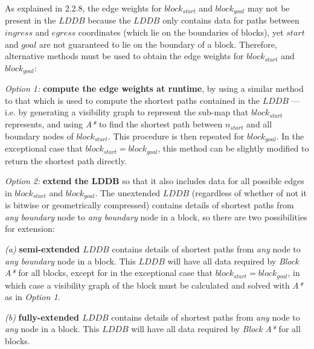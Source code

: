 \documentclass[12pt,notitlepage]{report}
\begin{document}
\noindent
As explained in 2.2.8, the edge weights for $block_{start}$ and $block_{goal}$ may not be present in the $LDDB$ because the $LDDB$ only contains data for paths between $ingress$ and $egress$ coordinates (which lie on the boundaries of blocks), yet $start$ and $goal$ are not guaranteed to lie on the boundary of a block. Therefore, alternative methods must be used to obtain the edge weights for $block_{start}$ and $block_{goal}$:
\begin{description}
\item {\em Option 1:} {\bfseries compute the edge weights at runtime}, by using a similar method to that which is used to compute the shortest paths contained in the $LDDB$ --- i.e. by generating a visibility graph to represent the sub-map that $block_{start}$ represents, and using {\em A*} to find the shortest path between $n_{start}$ and all boundary nodes of $block_{start}$. This procedure is then repeated for $block_{goal}$. In the exceptional case that $block_{start} = block_{goal}$, this method can be slightly modified to return the shortest path directly. 
\item {\em Option 2:} {\bfseries extend the LDDB} so that it also includes data for all possible edges in $block_{start}$ and $block_{goal}$. The unextended $LDDB$ (regardless of whether of not it is bitwise or geometrically compressed) contains details of shortest paths from {\em any boundary} node to {\em any boundary} node in a block, so there are two possibilities for extension:
  \begin{description}
  \item{\em (a)} {\bf semi-extended $LDDB$} contains details of shortest paths from {\em any} node to {\em any boundary} node in a block. This $LDDB$ will have all data required by {\em Block A*} for all blocks, except for in the exceptional case that $block_{start} = block_{goal}$, in which case a visibility graph of the block must be calculated and solved with {\em A*} as in {\em Option 1}.
  \item{\em (b)} {\bf fully-extended $LDDB$} contains details of shortest paths from {\em any} node to {\em any} node in a block. This $LDDB$ will have all data required by {\em Block A*} for all blocks.
  \end{description} 
\end{description}
\end{document}
